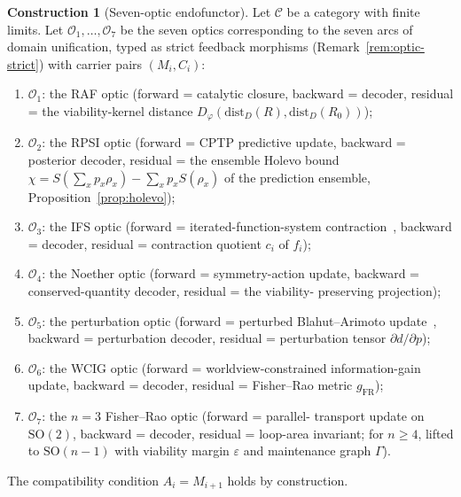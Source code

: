 \documentclass[11pt,a4paper]{article}
\theoremstyle{plain}
\theoremstyle{definition}
\newtheorem{construction}[theorem]{Construction}
\theoremstyle{remark}
\newcommand{\OO}{\mathcal{O}}
\newcommand{\CC}{\mathcal{C}}
\newcommand{\SO}{\mathrm{SO}}
\begin{document}
\begin{construction}[Seven-optic endofunctor]
\label{con:seven}
Let $\CC$ be a category with finite limits. Let $\OO_1,\ldots,\OO_7$
be the seven optics corresponding to the seven arcs of domain
unification, typed as strict feedback morphisms
(Remark~\ref{rem:optic-strict}) with carrier pairs
$(M_i, C_i)$:
\begin{enumerate}[leftmargin=*,itemsep=1pt]
\item $\OO_1$: the RAF optic (forward = catalytic closure, backward =
decoder, residual = the viability-kernel distance
$D_\varphi(\mathrm{dist}_D(R),\mathrm{dist}_D(R_0))$);
\item $\OO_2$: the RPSI optic (forward = CPTP predictive update,
backward = posterior decoder, residual = the ensemble Holevo bound
$\chi = S(\sum_x p_x \rho_x) - \sum_x p_x S(\rho_x)$ of the
prediction ensemble, Proposition~\ref{prop:holevo});
\item $\OO_3$: the IFS optic (forward = iterated-function-system
contraction~\cite{hutchinson1981,barnsley1988}, backward = decoder,
residual = contraction quotient $c_i$ of $f_i$);
\item $\OO_4$: the Noether optic (forward = symmetry-action update,
backward = conserved-quantity decoder, residual = the viability-
preserving projection);
\item $\OO_5$: the perturbation optic (forward = perturbed
Blahut--Arimoto update~\cite{blahut1972,arimoto1972}, backward =
perturbation decoder, residual = perturbation tensor
$\partial d/\partial p$);
\item $\OO_6$: the WCIG optic (forward = worldview-constrained
information-gain update, backward = decoder, residual = Fisher--Rao
metric $g_{\mathrm{FR}}$);
\item $\OO_7$: the $n=3$ Fisher--Rao optic (forward = parallel-
transport update on $\SO(2)$, backward = decoder, residual = loop-area
invariant; for $n\geq 4$, lifted to $\SO(n-1)$ with viability margin
$\varepsilon$ and maintenance graph $\Gamma$).
\end{enumerate}
The compatibility condition $A_i = M_{i+1}$ holds by construction.
\end{construction}
\end{document}
